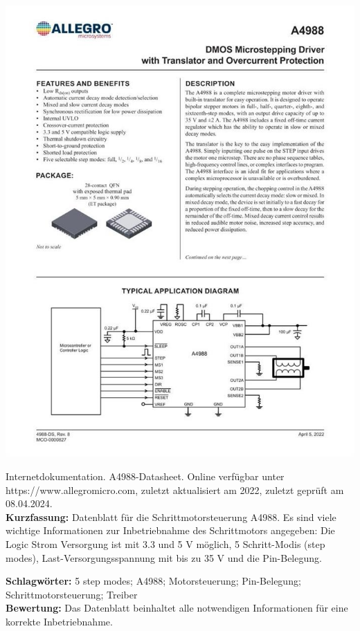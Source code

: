 {
\begin{minipage}{0.38\textwidth}
	\includegraphics[width=\linewidth]{images/Allegro.jpg}
\end{minipage}
\hfill
\begin{minipage}{0.6\textwidth}
Internetdokumentation. A4988-Datasheet.
Online verfügbar unter https://www.allegromicro.com, zuletzt aktualisiert am 2022, zuletzt geprüft am 08.04.2024.
\\ \textbf{Kurzfassung:}
Datenblatt für die Schrittmotorsteuerung A4988. Es sind viele wichtige Informationen zur Inbetriebnahme des Schrittmotors angegeben: Die Logic Strom Versorgung ist mit 3.3 und 5 V möglich, 5 Schritt-Modis (step modes), Last-Versorgungsspannung mit bis zu 35 V und die Pin-Belegung.
\end{minipage}
\textbf{Schlagwörter:}
5 step modes; A4988; Motorsteuerung; Pin-Belegung; Schrittmotorsteuerung; Treiber
\\ \textbf{Bewertung:}
Das Datenblatt beinhaltet alle notwendigen Informationen für eine korrekte Inbetriebnahme.
}

